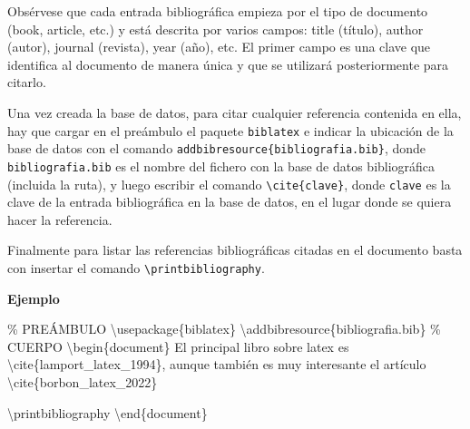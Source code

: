\documentclass[
  a4paper,
]{scrreport}
\newenvironment{Shaded}{\begin{snugshade}}{\end{snugshade}}
\newcommand{\BuiltInTok}[1]{\textcolor[rgb]{0.00,0.23,0.31}{#1}}
\newcommand{\CommentTok}[1]{\textcolor[rgb]{0.37,0.37,0.37}{#1}}
\newcommand{\ExtensionTok}[1]{\textcolor[rgb]{0.00,0.23,0.31}{#1}}
\newcommand{\FunctionTok}[1]{\textcolor[rgb]{0.28,0.35,0.67}{#1}}
\newcommand{\KeywordTok}[1]{\textcolor[rgb]{0.00,0.23,0.31}{#1}}
\newcommand{\NormalTok}[1]{\textcolor[rgb]{0.00,0.23,0.31}{#1}}
\begin{document}
Obsérvese que cada entrada bibliográfica empieza por el tipo de
documento (book, article, etc.) y está descrita por varios campos: title
(título), author (autor), journal (revista), year (año), etc. El primer
campo es una clave que identifica al documento de manera única y que se
utilizará posteriormente para citarlo.

Una vez creada la base de datos, para citar cualquier referencia
contenida en ella, hay que cargar en el preámbulo el paquete
\texttt{biblatex} e indicar la ubicación de la base de datos con el
comando \texttt{addbibresource\{bibliografia.bib\}}, donde
\texttt{bibliografia.bib} es el nombre del fichero con la base de datos
bibliográfica (incluida la ruta), y luego escribir el comando
\texttt{\textbackslash{}cite\{clave\}}, donde \texttt{clave} es la clave
de la entrada bibliográfica en la base de datos, en el lugar donde se
quiera hacer la referencia.

Finalmente para listar las referencias bibliográficas citadas en el
documento basta con insertar el comando
\texttt{\textbackslash{}printbibliography}.

\textbf{Ejemplo}

\begin{Shaded}
\begin{Highlighting}[]
\CommentTok{\% PREÁMBULO}
\BuiltInTok{\textbackslash{}usepackage}\NormalTok{\{}\ExtensionTok{biblatex}\NormalTok{\}}
\FunctionTok{\textbackslash{}addbibresource}\NormalTok{\{bibliografia.bib\}}
\CommentTok{\% CUERPO}
\KeywordTok{\textbackslash{}begin}\NormalTok{\{}\ExtensionTok{document}\NormalTok{\}}
\NormalTok{El principal libro sobre latex es }\KeywordTok{\textbackslash{}cite}\NormalTok{\{}\ExtensionTok{lamport\_latex\_1994}\NormalTok{\}, aunque también }
\NormalTok{es muy interesante el artículo }\KeywordTok{\textbackslash{}cite}\NormalTok{\{}\ExtensionTok{borbon\_latex\_2022}\NormalTok{\}}

\FunctionTok{\textbackslash{}printbibliography}
\KeywordTok{\textbackslash{}end}\NormalTok{\{}\ExtensionTok{document}\NormalTok{\}}
\end{Highlighting}
\end{Shaded}
\end{document}
